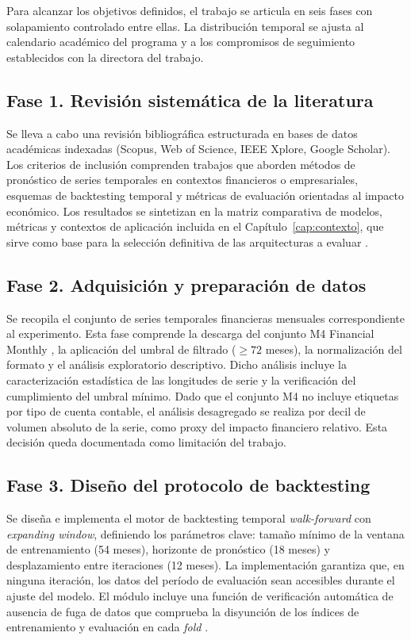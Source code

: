 Para alcanzar los objetivos definidos, el trabajo se articula en seis fases con solapamiento controlado entre ellas. La distribución temporal se ajusta al calendario académico del programa y a los compromisos de seguimiento establecidos con la directora del trabajo.

\subsection{Fase 1. Revisión sistemática de la literatura}
\label{subsec:fase1}

Se lleva a cabo una revisión bibliográfica estructurada en bases de datos académicas indexadas (Scopus, Web of Science, IEEE Xplore, Google Scholar). Los criterios de inclusión comprenden trabajos que aborden métodos de pronóstico de series temporales en contextos financieros o empresariales, esquemas de backtesting temporal y métricas de evaluación orientadas al impacto económico. Los resultados se sintetizan en la matriz comparativa de modelos, métricas y contextos de aplicación incluida en el Capítulo~\ref{cap:contexto}, que sirve como base para la selección definitiva de las arquitecturas a evaluar \parencite{Petropoulos2022}.

\subsection{Fase 2. Adquisición y preparación de datos}
\label{subsec:fase2}

Se recopila el conjunto de series temporales financieras mensuales correspondiente al experimento. Esta fase comprende la descarga del conjunto M4 Financial Monthly \parencite{Makridakis2020M4}, la aplicación del umbral de filtrado ($\geq 72$ meses), la normalización del formato y el análisis exploratorio descriptivo. Dicho análisis incluye la caracterización estadística de las longitudes de serie y la verificación del cumplimiento del umbral mínimo. Dado que el conjunto M4 no incluye etiquetas por tipo de cuenta contable, el análisis desagregado se realiza por decil de volumen absoluto de la serie, como proxy del impacto financiero relativo. Esta decisión queda documentada como limitación del trabajo.

\subsection{Fase 3. Diseño del protocolo de backtesting}
\label{subsec:fase3}

Se diseña e implementa el motor de backtesting temporal \textit{walk-forward} con \textit{expanding window}, definiendo los parámetros clave: tamaño mínimo de la ventana de entrenamiento (54 meses), horizonte de pronóstico (18 meses) y desplazamiento entre iteraciones (12 meses). La implementación garantiza que, en ninguna iteración, los datos del período de evaluación sean accesibles durante el ajuste del modelo. El módulo incluye una función de verificación automática de ausencia de fuga de datos que comprueba la disyunción de los índices de entrenamiento y evaluación en cada \textit{fold} \parencite{Bergmeir2012}.

